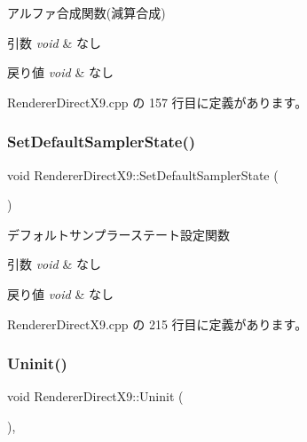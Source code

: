 アルファ合成関数(減算合成) 


\begin{DoxyParams}{引数}
{\em void} & なし \\
\hline
\end{DoxyParams}

\begin{DoxyRetVals}{戻り値}
{\em void} & なし \\
\hline
\end{DoxyRetVals}


 Renderer\+Direct\+X9.\+cpp の 157 行目に定義があります。

\mbox{\label{class_renderer_direct_x9_a229cd266427d96486c43d2e63300e438}} 
\subsubsection{\texorpdfstring{Set\+Default\+Sampler\+State()}{SetDefaultSamplerState()}}
{\footnotesize\ttfamily void Renderer\+Direct\+X9\+::\+Set\+Default\+Sampler\+State (\begin{DoxyParamCaption}{ }\end{DoxyParamCaption})}



デフォルトサンプラーステート設定関数 


\begin{DoxyParams}{引数}
{\em void} & なし \\
\hline
\end{DoxyParams}

\begin{DoxyRetVals}{戻り値}
{\em void} & なし \\
\hline
\end{DoxyRetVals}


 Renderer\+Direct\+X9.\+cpp の 215 行目に定義があります。

\mbox{\label{class_renderer_direct_x9_af7ff314cbaa894d71e37c10565002f8f}} 
\subsubsection{\texorpdfstring{Uninit()}{Uninit()}}
{\footnotesize\ttfamily void Renderer\+Direct\+X9\+::\+Uninit (\begin{DoxyParamCaption}{ }\end{DoxyParamCaption})\hspace{0.3cm}{\ttfamily [override]}, {\ttfamily [virtual]}}



